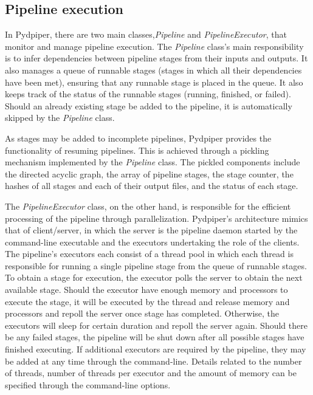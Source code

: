 \documentclass{report}
\begin{document}
        \subsection{Pipeline execution}
        
        In Pydpiper, there are two main classes,\textit{Pipeline} and
        \textit{PipelineExecutor}, that monitor and manage pipeline execution.
        The \textit{Pipeline} class's main responsibility is to infer
        dependencies between pipeline stages from their inputs and outputs. It
        also manages a queue of runnable stages (stages in which all their
        dependencies have been met), ensuring that any runnable stage is placed
        in the queue. It also keeps track of the status of the runnable stages
        (running, finished, or failed). Should an already existing stage be
        added to the pipeline, it is automatically skipped by the
        \textit{Pipeline} class. 

        As stages may be added to incomplete pipelines, Pydpiper provides the
        functionality of resuming pipelines. This is achieved through a pickling
        mechanism implemented by the \textit{Pipeline} class. The pickled
        components include the directed acyclic graph, the array of pipeline
        stages, the stage counter, the hashes of all stages and each of their
        output files, and the status of each stage.

        The \textit{PipelineExecutor} class, on the other hand, is responsible
        for the efficient processing of the pipeline through parallelization.
        Pydpiper's architecture mimics that of client/server, in which the
        server is the pipeline daemon started by the command-line executable and
        the executors undertaking the role of the clients. The pipeline's
        executors each consist of a thread pool in which each thread is
        responsible for running a single pipeline stage from the queue of
        runnable stages. To obtain a stage for execution, the executor polls the
        server to obtain the next available stage. Should the executor have
        enough memory and processors to execute the stage, it will be executed
        by the thread and release memory and processors and repoll the server
        once stage has completed.  Otherwise, the executors will sleep for
        certain duration and repoll the server again.  Should there be any
        failed stages, the pipeline will be shut down after all possible stages
        have finished executing. If additional executors are required by the
        pipeline, they may be added at any time through the command-line.
        Details related to the number of threads, number of threads per executor
        and the amount of memory can be specified through the command-line
        options. 
\end{document}
